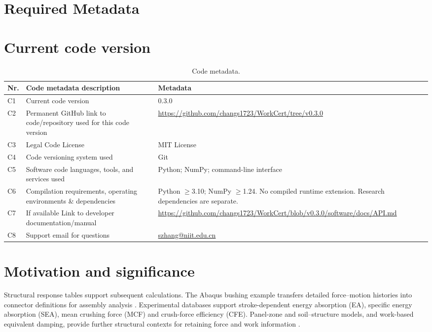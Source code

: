 \documentclass[preprint,12pt,a4paper]{elsarticle}
\begin{document}
\section*{Required Metadata}\section*{Current code version}
\begin{table}[H]\small\centering
\begin{tabular}{|P{.05\linewidth}|P{.39\linewidth}|P{.425\linewidth}|}\hline
\textbf{Nr.}&\textbf{Code metadata description}&\textbf{Metadata}\\\hline
C1&Current code version&0.3.0\\\hline
C2&Permanent GitHub link to code/repository used for this code version&\url{https://github.com/changs1723/WorkCert/tree/v0.3.0}\\\hline
C3&Legal Code License&MIT License\\\hline
C4&Code versioning system used&Git\\\hline
C5&Software code languages, tools, and services used&Python; NumPy; command-line interface\\\hline
C6&Compilation requirements, operating environments \& dependencies&Python $\geq$3.10; NumPy $\geq$1.24. No compiled runtime extension. Research dependencies are separate.\\\hline
C7&If available Link to developer documentation/manual&\url{https://github.com/changs1723/WorkCert/blob/v0.3.0/software/docs/API.md}\\\hline
C8&Support email for questions&\href{mailto:szhang@niit.edu.cn}{szhang@niit.edu.cn}\\\hline
\end{tabular}\caption{Code metadata.}\end{table}


\section{Motivation and significance}
Structural response tables support subsequent calculations. The Abaqus bushing example transfers detailed force--motion histories into connector definitions for assembly analysis \cite{AbaqusBushing}. Experimental databases support stroke-dependent energy absorption (EA), specific energy absorption (SEA), mean crushing force (MCF) and crush-force efficiency (CFE). Panel-zone and soil--structure models, and work-based equivalent damping, provide further structural contexts for retaining force and work information \cite{Kalapodis2025Panel,Kalapodis2025SSI,Muho2024MDOF}.
\end{document}
